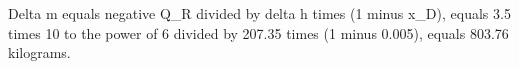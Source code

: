 Delta m equals negative Q_R divided by delta h times (1 minus x_D), equals 3.5 times 10 to the power of 6 divided by 207.35 times (1 minus 0.005), equals 803.76 kilograms.